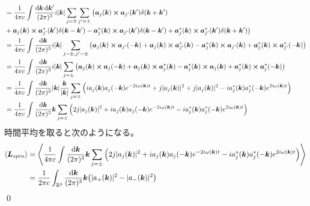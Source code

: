 \documentclass[uplatex,dvipdfmx,a4paper,11pt]{jlreq}
\makeatletter
\newcommand{\RR}{\mathbb{R}}
\newcommand{\kk}{\bm{k}}
\theoremstyle{definition}
\renewenvironment{proof}[1][\proofname]{\par
  \normalfont
  \topsep6\p@\@plus6\p@ \trivlist
  \item[\hskip\labelsep{\bfseries #1}\@addpunct{\bfseries}]\ignorespaces\quad\par
}{%
  \qed\endtrivlist\@endpefalse
}
\renewcommand\proofname{証明}
\makeatother
\begin{document}
\begin{proof}
\begin{align}
     & = \frac{1}{4\pi c}\int\frac{\dd{\kk}\dd{\kk'}}{(2\pi)^3}i|\kk|\sum_{j=\pm}\sum_{j'=\pm}\big(\bm{a}_j(\kk)\cross\bm{a}_{j'}(\kk')\delta(\kk + \kk')                                                                                                                                                                       \\
     & + \bm{a}_j(\kk)\cross\bm{a}_{j'}^*(\kk')\delta(\kk - \kk') - \bm{a}_j^*(\kk)\cross\bm{a}_{j'}(\kk')\delta(\kk - \kk') + \bm{a}_j^*(\kk)\cross\bm{a}_{j'}^*(\kk')\delta(\kk + \kk')\big)                                                                                                                                  \\
     & = \frac{1}{4\pi c}\int\frac{\dd{\kk}}{(2\pi)^3}i|\kk|\sum_{j=\pm, j'=\pm}\qty(\bm{a}_j(\kk)\cross\bm{a}_{j'}(-\kk) + \bm{a}_j(\kk)\cross\bm{a}_{j'}^*(\kk) - \bm{a}_j^*(\kk)\cross\bm{a}_{j'}(\kk) + \bm{a}_j^*(\kk)\cross\bm{a}_{j'}^*(-\kk))                                                                           \\
     & = \frac{1}{4\pi c}\int\frac{\dd{\kk}}{(2\pi)^3}i|\kk|\sum_{j=\pm}\qty(\bm{a}_j(\kk)\cross\bm{a}_j(-\kk) + \bm{a}_j(\kk)\cross\bm{a}_j^*(\kk) - \bm{a}_j^*(\kk)\cross\bm{a}_j(\kk) + \bm{a}_j^*(\kk)\cross\bm{a}_j^*(-\kk))                                                                                               \\
     & = \frac{1}{4\pi c}\int\frac{\dd{\kk}}{(2\pi)^3}|\kk|\frac{\kk}{|\kk|}\sum_{j=\pm}\qty(ia_j(\kk)a_j(-\kk)e^{-2i\omega(\kk)t} + j|a_j(\kk)|^2 + j|a_j(\kk)|^2 - ia_j^*(\kk)a_j^*(-\kk)e^{2i\omega(\kk)t})                                                                                                                  \\
     & = \frac{1}{4\pi c}\int\frac{\dd{\kk}}{(2\pi)^3}\kk\sum_{j=\pm}\qty(2j|a_j(\kk)|^2 + ia_j(\kk)a_j(-\kk)e^{-2i\omega(\kk)t} - ia_j^*(\kk)a_j^*(-\kk)e^{2i\omega(\kk)t})
  \end{align}
  時間平均を取ると次のようになる。
  \begin{align}
    \ev{\LL_{spin}} & = \ev{\frac{1}{4\pi c}\int\frac{\dd{\kk}}{(2\pi)^3}\kk\sum_{j=\pm}\qty(2j|a_j(\kk)|^2 + ia_j(\kk)a_j(-\kk)e^{-2i\omega(\kk)t} - ia_j^*(\kk)a_j^*(-\kk)e^{2i\omega(\kk)t})} \\
                    & = \frac{1}{2\pi c}\int_{\RR^3}\frac{\dd{\kk}}{(2\pi)^3}\kk\qty(|a_+(\kk)|^2 - |a_-(\kk)|^2)
  \end{align}
\end{proof}
\end{document}
